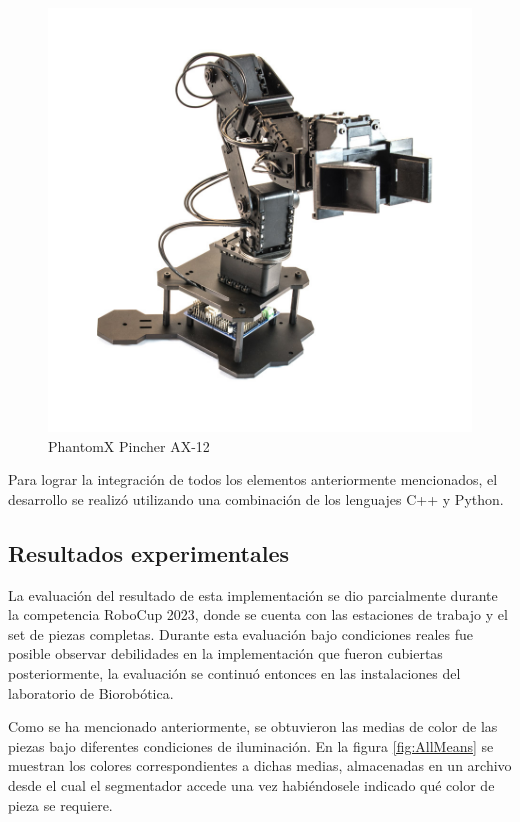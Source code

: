             \begin{figure}[H]
                \centering
                \includegraphics[scale=0.2]{Figures/Phantom_Pincher.jpg}
                    \caption{PhantomX Pincher AX-12 \cite{Inerbotix_pincher_arm}}
                    \label{fig:Phantom_Pincher}
            \end{figure}
Para lograr la integración de todos los elementos anteriormente mencionados, el desarrollo se realizó utilizando una combinación de los lenguajes C++ y Python. 

\subsection{Resultados experimentales}
La evaluación del resultado de esta implementación se dio parcialmente durante la competencia RoboCup 2023, donde se cuenta con las estaciones de trabajo y el set de piezas completas. Durante esta evaluación bajo condiciones reales fue posible observar debilidades en la implementación que fueron cubiertas posteriormente, la evaluación se continuó entonces en las instalaciones del laboratorio de Biorobótica. 

Como se ha mencionado anteriormente, se obtuvieron las medias de color de las piezas bajo diferentes condiciones de iluminación. En la figura \ref{fig:AllMeans} se muestran los colores correspondientes a dichas medias, almacenadas en un archivo desde el cual el segmentador accede una vez habiéndosele indicado qué color de pieza se requiere. 

